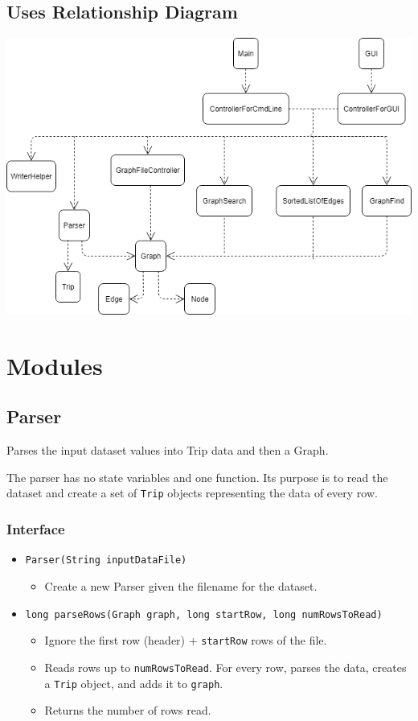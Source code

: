 \documentclass[12pt]{article}
\newcommand{\bi}{\begin{itemize}}
\newcommand{\ei}{\end{itemize}}
\newcommand{\code}[1]{\texttt{#1}}
\begin{document}
\newpage

\subsection{Uses Relationship Diagram}

\begin{center}
\includegraphics[scale = 0.70]{Images/Uses.png} 
\end{center}

\newpage

\section{Modules}

\subsection{Parser}

Parses the input dataset values into Trip data and then a Graph. 

The parser has no state variables and one function. Its purpose is to read the dataset and create a set of \code{Trip} objects representing the data of every row.

\subsubsection{Interface}

\bi
	\item \code{Parser(String inputDataFile)}
	\bi
		\item Create a new Parser given the filename for the dataset.
	\ei
	\item \code{long parseRows(Graph graph, long startRow, long numRowsToRead)}
	\bi
	    \item Ignore the first row (header) + \code{startRow} rows of the file.
		\item Reads rows up to \code{numRowsToRead}. For every row, parses the data, creates a \code{Trip} object, and adds it to \code{graph}.
		\item Returns the number of rows read.
	\ei
\ei
\end{document}
